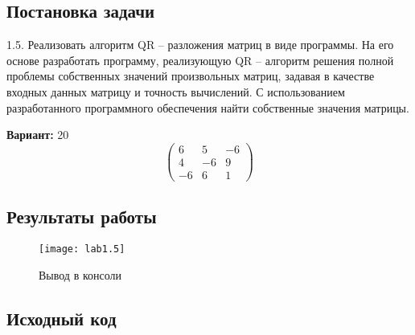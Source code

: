 \subsection{Постановка задачи}
1.5. Реализовать алгоритм QR – разложения матриц в виде программы. На его основе разработать программу, реализующую QR – алгоритм решения полной проблемы собственных значений произвольных матриц, задавая в качестве входных данных матрицу и точность вычислений. С использованием разработанного программного обеспечения найти собственные значения матрицы.

{\bfseries Вариант:} 20
\begin{equation}
      \begin{pmatrix}
        6 & 5 & -6\\
        4 & -6 & 9\\
        -6 & 6 & 1
      \end{pmatrix}
\end{equation}
\pagebreak

\subsection{Результаты работы}

\begin{figure}[h!]
\centering
\texttt{[image: lab1.5]}
\caption{Вывод в консоли}
\end{figure}
\pagebreak

\vfill

\subsection{Исходный код}


\pagebreak